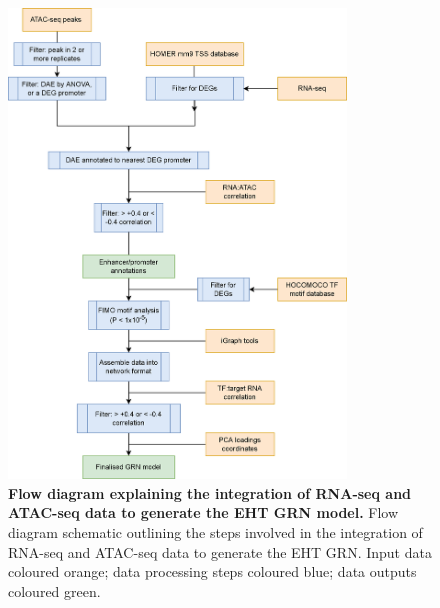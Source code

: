 \begin{figure}[p]
    \centering
    \includegraphics[width=0.8\textwidth,height=\textheight,keepaspectratio]{figures/appendix/app_eht-workflow.png}
    \caption[{Flow diagram explaining the integration of RNA-seq and ATAC-seq data to generate the EHT GRN model.}]
    {\textbf{Flow diagram explaining the integration of RNA-seq and ATAC-seq data to generate the EHT GRN model.} 
    Flow diagram schematic outlining the steps involved in the integration of RNA-seq and ATAC-seq data to generate the EHT GRN. Input data coloured orange; data processing steps coloured blue; data outputs coloured green.
    }
    \label{fig:app_eht-workflow}
\end{figure}
\clearpage

